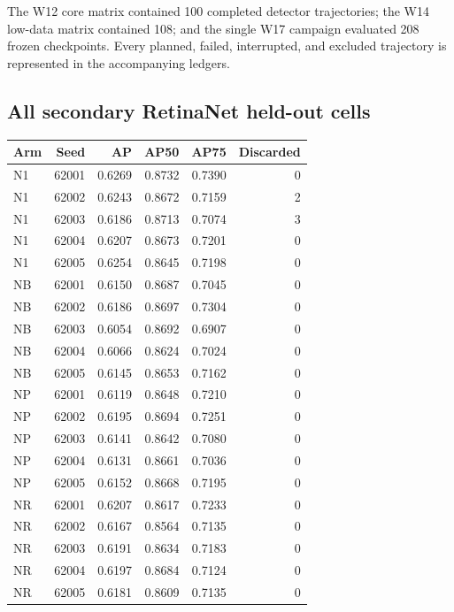 The W12 core matrix contained 100 completed detector trajectories; the W14 low-data matrix contained 108; and the single W17 campaign evaluated 208 frozen checkpoints. Every planned, failed, interrupted, and excluded trajectory is represented in the accompanying ledgers.
\subsection{All secondary RetinaNet held-out cells}
\begin{tabular}{lrrrrr}
\toprule
Arm & Seed & AP & AP50 & AP75 & Discarded \\
\midrule
N1 & 62001 & 0.6269 & 0.8732 & 0.7390 & 0 \\
N1 & 62002 & 0.6243 & 0.8672 & 0.7159 & 2 \\
N1 & 62003 & 0.6186 & 0.8713 & 0.7074 & 3 \\
N1 & 62004 & 0.6207 & 0.8673 & 0.7201 & 0 \\
N1 & 62005 & 0.6254 & 0.8645 & 0.7198 & 0 \\
NB & 62001 & 0.6150 & 0.8687 & 0.7045 & 0 \\
NB & 62002 & 0.6186 & 0.8697 & 0.7304 & 0 \\
NB & 62003 & 0.6054 & 0.8692 & 0.6907 & 0 \\
NB & 62004 & 0.6066 & 0.8624 & 0.7024 & 0 \\
NB & 62005 & 0.6145 & 0.8653 & 0.7162 & 0 \\
NP & 62001 & 0.6119 & 0.8648 & 0.7210 & 0 \\
NP & 62002 & 0.6195 & 0.8694 & 0.7251 & 0 \\
NP & 62003 & 0.6141 & 0.8642 & 0.7080 & 0 \\
NP & 62004 & 0.6131 & 0.8661 & 0.7036 & 0 \\
NP & 62005 & 0.6152 & 0.8668 & 0.7195 & 0 \\
NR & 62001 & 0.6207 & 0.8617 & 0.7233 & 0 \\
NR & 62002 & 0.6167 & 0.8564 & 0.7135 & 0 \\
NR & 62003 & 0.6191 & 0.8634 & 0.7183 & 0 \\
NR & 62004 & 0.6197 & 0.8684 & 0.7124 & 0 \\
NR & 62005 & 0.6181 & 0.8609 & 0.7135 & 0 \\
\bottomrule
\end{tabular}
